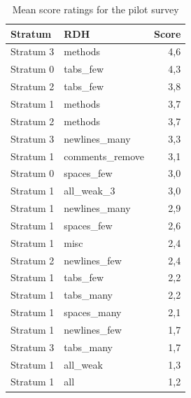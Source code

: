 \documentclass[%
class=scrreprt,
chapterprefix=false,%
open=right,%
twoside=false,%
paper=a4,%
logofile={Logo\_zentral\_farbig\_EN.png},%
thesistype=master,%
UKenglish,%
]{se2thesis}
\theoremstyle{definition}
\begin{document}
		
	\begin{table}[htbp]
		\centering
		\caption{Mean score ratings for the pilot survey}
		\vspace{8pt}
		\label{tab:pilot_survey_results}
		\begin{tabular}{llr}
			\toprule
			\textbf{Stratum} & \textbf{RDH} & \textbf{Score} \\
			\midrule
			Stratum 3 & methods & 4,6 \\
			Stratum 0 & tabs\_few & 4,3 \\
			Stratum 2 & tabs\_few & 3,8 \\
			Stratum 1 & methods & 3,7 \\
			Stratum 2 & methods & 3,7 \\
			Stratum 3 & newlines\_many & 3,3 \\
			Stratum 1 & comments\_remove & 3,1 \\
			Stratum 0 & spaces\_few & 3,0 \\
			Stratum 1 & all\_weak\_3 & 3,0 \\
			Stratum 1 & newlines\_many & 2,9 \\
			Stratum 1 & spaces\_few & 2,6 \\
			Stratum 1 & misc & 2,4 \\
			Stratum 2 & newlines\_few & 2,4 \\
			Stratum 1 & tabs\_few & 2,2 \\
			Stratum 1 & tabs\_many & 2,2 \\
			Stratum 1 & spaces\_many & 2,1 \\
			Stratum 1 & newlines\_few & 1,7 \\
			Stratum 3 & tabs\_many & 1,7 \\
			Stratum 1 & all\_weak & 1,3 \\
			Stratum 1 & all & 1,2 \\
			\bottomrule
		\end{tabular}
	\end{table}
	
\end{document}
